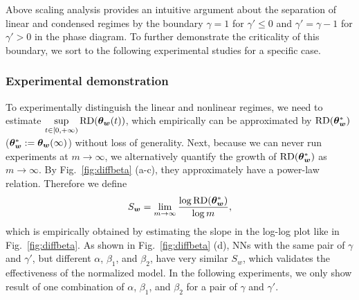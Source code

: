\documentclass[twoside,11pt]{article}
\begin{document}
Above scaling analysis provides an intuitive argument about the separation of linear and condensed regimes by the boundary $\gamma=1$ for $\gamma'\leq0$ and $\gamma'=\gamma-1$ for $\gamma'>0$ in the phase diagram. To further demonstrate the criticality of this boundary, we sort to the following experimental studies for a specific case.

\subsubsection{Experimental demonstration}
To experimentally distinguish the linear and nonlinear regimes, we need to estimate $\sup\limits_{t\in[0,+\infty)}\mathrm{RD}(\bm{\theta}_{\bm{w}}(t))$, which empirically can be approximated by $\mathrm{RD}(\bm{\theta}_{\bm{w}}^*)$ ($\bm{\theta}_{\bm{w}}^*:=\bm{\theta}_{\bm{w}}(\infty)$) without loss of generality. Next, because we can never run experiments at $m\to\infty$, we alternatively quantify the growth of $\mathrm{RD}(\bm{\theta}^*_{\bm{w}})$ as $m\to\infty$. By Fig.~\ref{fig:diffbeta} (a-c), they approximately have a power-law relation. Therefore we define
\begin{equation}
    S_{\bm{w}}=\lim_{m\to\infty}\frac{\log \mathrm{RD}(\bm{\theta}^*_{\bm{w}})}{\log m},
\end{equation}
which is empirically obtained by estimating the slope in the log-log plot like in Fig.~\ref{fig:diffbeta}. As shown in Fig.~\ref{fig:diffbeta} (d), NNs with the same pair of $\gamma$ and $\gamma'$, but different $\alpha$, $\beta_1$, and $\beta_2$, have very similar $S_{w}$, which validates the effectiveness of the normalized model. In the following experiments, we only show result of one combination of $\alpha$, $\beta_1$, and $\beta_2$ for a pair of $\gamma$ and $\gamma'$.
\end{document}
